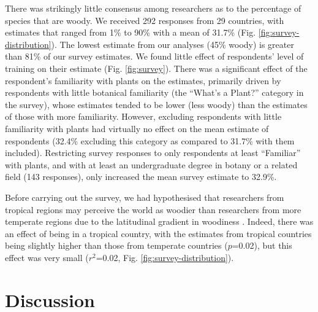 \documentclass[a4paper,12pt]{article}
\begin{document}
There was strikingly little consensus among researchers as to the
percentage of species that are woody.  We received 292 responses from
29 countries, with estimates that ranged from 1\% to 90\% with a mean
of 31.7\% (Fig. \ref{fig:survey-distribution}).  The lowest
estimate from our analyses (45\% woody) is greater than 81\% of our survey estimates.
We found little effect of respondents' level of training on their
estimate (Fig. \ref{fig:survey}).  There was a significant effect of
the respondent's familiarity with plants on the estimates, primarily
driven by respondents with little botanical familiarity (the ``What's
a Plant?'' category in the survey), whose estimates tended to be lower (less woody)
than the estimates of those with more familiarity. However, excluding
respondents with little familiarity with plants had virtually no effect
on the mean estimate of respondents (32.4\% excluding this category as compared
to 31.7\% with them included).
Restricting survey responses to only respondents at least ``Familiar''
with plants, and with at least an undergraduate degree in botany or a
related field (143 responses), only increased the mean survey estimate
to 32.9\%.

Before carrying out the survey, we had hypothesised that researchers
from tropical regions may perceive the world as woodier than
researchers from more temperate regions due to the latitudinal
gradient in woodiness \citep{Molesheihgt}.
%
Indeed, there was an effect of being in a tropical country, with the
estimates from tropical countries being slightly higher than those
from temperate countries ($p$=0.02), but this effect was very small
($r^2$=0.02, Fig. \ref{fig:survey-distribution}).

\section{Discussion}
\end{document}
